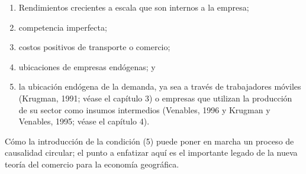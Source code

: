 \begin{enumerate}
    \item Rendimientos crecientes a escala que son internos a la empresa; 
    \item competencia imperfecta;
    \item costos positivos de transporte o comercio; 
    \item ubicaciones de empresas endógenas; y 
    \item la ubicación endógena de la demanda, ya sea a través de trabajadores móviles (Krugman, 1991; véase el capítulo 3) o empresas que utilizan la producción de su sector como insumos intermedios (Venables, 1996 y Krugman y Venables, 1995; véase el capítulo 4).
\end{enumerate}

Cómo la introducción de la condición (5) puede poner en marcha un proceso de causalidad circular; el punto a enfatizar aquí es el importante legado de la nueva teoría del comercio para la economía geográfica. \\

